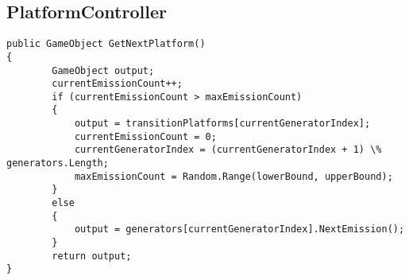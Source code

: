 \subsection{PlatformController}


\begin{lstlisting}[caption=Caption example.,
  label=a_label]
public GameObject GetNextPlatform()
{
        GameObject output;
        currentEmissionCount++;
        if (currentEmissionCount > maxEmissionCount)
        {
            output = transitionPlatforms[currentGeneratorIndex];
            currentEmissionCount = 0;
            currentGeneratorIndex = (currentGeneratorIndex + 1) \% generators.Length;
            maxEmissionCount = Random.Range(lowerBound, upperBound);
        }
        else
        {
            output = generators[currentGeneratorIndex].NextEmission();
        }
        return output;
}
\end{lstlisting}
